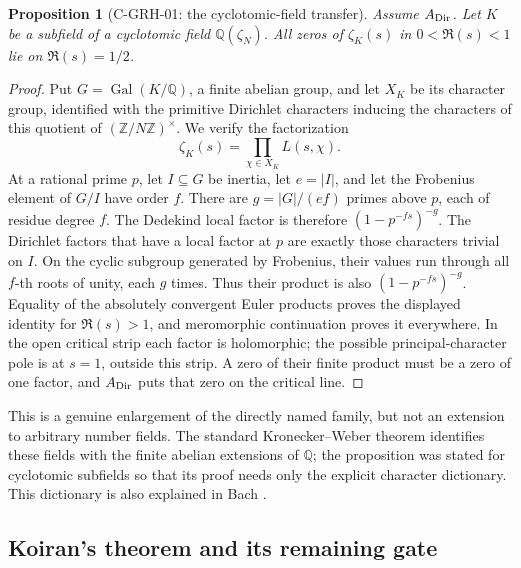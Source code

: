 \documentclass[11pt,a4paper]{article}
\newtheorem{proposition}{Proposition}[section]
\begin{document}
\begin{proposition}[C-GRH-01: the cyclotomic-field transfer]
Assume \(A_{\rm Dir}\).  Let \(K\) be a subfield of a cyclotomic field
\(\mathbb Q(\zeta_N)\).  All zeros of \(\zeta_K(s)\) in
\(0<\Re(s)<1\) lie on \(\Re(s)=1/2\).
\end{proposition}
\begin{proof}
Put \(G=\operatorname{Gal}(K/\mathbb Q)\), a finite abelian group, and let
\(X_K\) be its character group, identified with the primitive Dirichlet
characters inducing the characters of this quotient of
\((\mathbb Z/N\mathbb Z)^\times\).  We verify the factorization
\[
 \zeta_K(s)=\prod_{\chi\in X_K}L(s,\chi).
\]
At a rational prime \(p\), let \(I\subseteq G\) be inertia, let
\(e=|I|\), and let the Frobenius element of \(G/I\) have order \(f\).
There are \(g=|G|/(ef)\) primes above \(p\), each of residue degree \(f\).
The Dedekind local factor is therefore \((1-p^{-fs})^{-g}\).
The Dirichlet factors that have a local factor at \(p\) are exactly those
characters trivial on \(I\).  On the cyclic subgroup generated by Frobenius,
their values run through all \(f\)-th roots of unity, each \(g\) times.
Thus their product is also \((1-p^{-fs})^{-g}\).  Equality of the absolutely
convergent Euler products proves the displayed identity for \(\Re(s)>1\),
and meromorphic continuation proves it everywhere.  In the open critical
strip each factor is holomorphic; the possible principal-character pole is
at \(s=1\), outside this strip.  A zero of their finite product must be a
zero of one factor, and \(A_{\rm Dir}\) puts that zero on the critical line.
\end{proof}

This is a genuine enlargement of the directly named family, but not an
extension to arbitrary number fields.  The standard Kronecker--Weber theorem
identifies these fields with the finite abelian extensions of \(\mathbb Q\);
the proposition was stated for cyclotomic subfields so that its proof needs
only the explicit character dictionary.  This dictionary is also explained
in Bach \cite[\S6, p.~369]{CBach90}.

\subsection{Koiran's theorem and its remaining gate}
\end{document}
